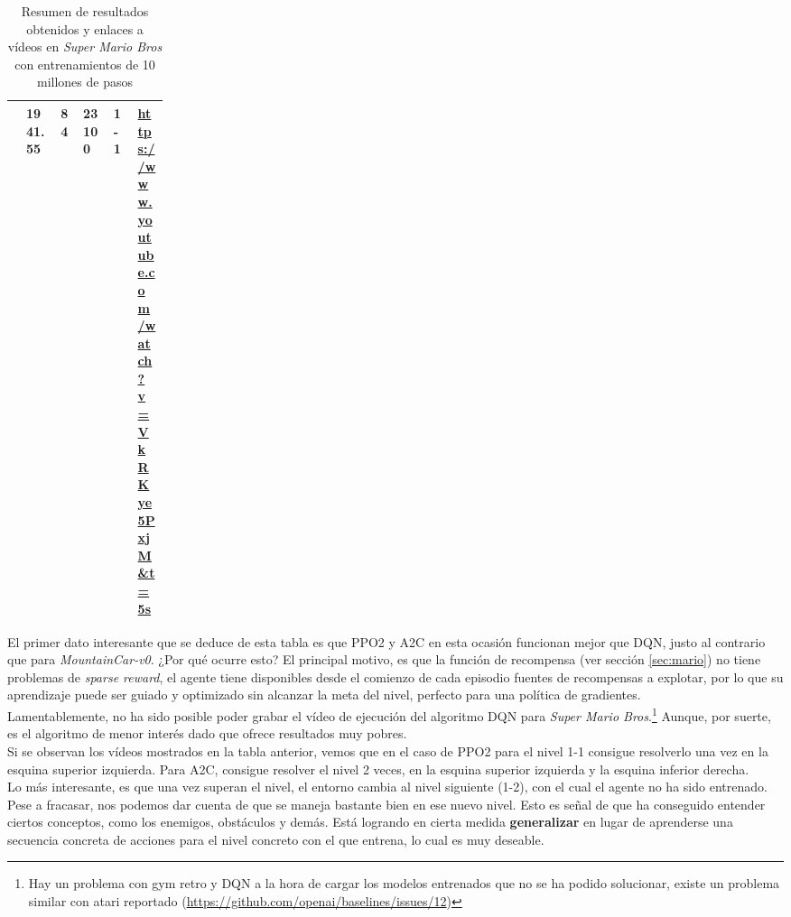 \documentclass[11pt,fleqn]{book} %
\begin{document}
\begin{table}[H]
\begin{tabular}{l|l|l|l|l|p{0.2\linewidth}|}
		\rowcolor[HTML]{FFFFFF} 
		                    & 1941.55                                                                                                           & 84                                                                                   & 23100                                                                                                              & 1-1                                                                                                                & \url{https://www.youtube.com/watch?v=VkRKye5PxjM&t=5s}                                \\ \hline
	\end{tabular}
	\caption{Resumen de resultados obtenidos y enlaces a vídeos en \textit{Super Mario Bros} con entrenamientos de 10 millones de pasos}
	\label{table:resultadosMario1}
\end{table}

El primer dato interesante que se deduce de esta tabla es que PPO2 y A2C en esta ocasión funcionan mejor que DQN, justo al contrario que para \textit{MountainCar-v0}. ¿Por qué ocurre esto? El principal motivo, es que la función de recompensa (ver sección \ref{sec:mario}) no tiene problemas de \textit{sparse reward}, el agente tiene disponibles desde el comienzo de cada episodio fuentes de recompensas a explotar, por lo que su aprendizaje puede ser guiado y optimizado sin alcanzar la meta del nivel, perfecto para una política de gradientes.\\

Lamentablemente, no ha sido posible poder grabar el vídeo de ejecución del algoritmo DQN para \textit{Super Mario Bros}.\footnote{Hay un problema con gym retro y DQN a la hora de cargar los modelos entrenados que no se ha podido solucionar, existe un problema similar con atari reportado (\url{https://github.com/openai/baselines/issues/12})} Aunque, por suerte, es el algoritmo de menor interés dado que ofrece resultados muy pobres. \\

Si se observan los vídeos mostrados en la tabla anterior, vemos que en el caso de PPO2 para el nivel 1-1 consigue resolverlo una vez en la esquina superior izquierda. Para A2C, consigue resolver el nivel 2 veces, en la esquina superior izquierda y la esquina inferior derecha. \\

Lo más interesante, es que una vez superan el nivel, el entorno cambia al nivel siguiente (1-2), con el cual el agente no ha sido entrenado. Pese a fracasar, nos podemos dar cuenta de que se maneja bastante bien en ese nuevo nivel. Esto es señal de que ha conseguido entender ciertos conceptos, como los enemigos, obstáculos y demás. Está logrando en cierta medida \textbf{generalizar} en lugar de aprenderse una secuencia concreta de acciones para el nivel concreto con el que entrena, lo cual es muy deseable.\\
\end{document}

